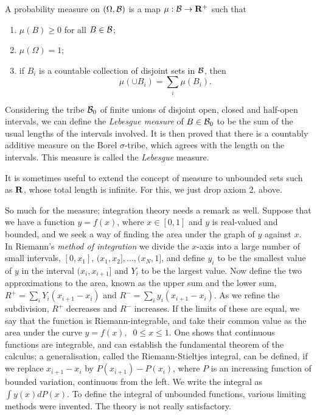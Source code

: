 A probability measure on $(\Omega,{\cal B})$ is a map $\mu:{\cal B}
\rightarrow{\bf R}^+$ such that
\begin{enumerate}
\item $\mu(B)\geq0$ for all $B\in{\cal B}$;
\item $\mu(\Omega)=1$;
\item if $B_i$ is a countable collection of disjoint sets in ${\cal B}$,
then
\[\mu(\cup B_i)=\sum_i\mu(B_i).\]
\end{enumerate}
Considering the tribe ${\cal B}_0$ of finite unions of disjoint open,
closed
and half-open intervals, we can define the {\em Lebesgue measure} of
$B\in{\cal B}_0$ to be the sum of the usual lengths of the intervals
involved. It is then proved that there is a countably additive measure
on the Borel $\sigma$-tribe, which agrees with the length on the intervals.
This measure is called the {\em Lebesgue} measure.

It is sometimes useful to extend the concept of measure to unbounded sets
such as ${\bf R}$, whose total length is infinite. For this, we just
drop axiom 2. above.

So much for the measure; integration theory needs a remark as well.
Suppose that we have a function $y=f(x)$, where $x\in[0,1]$ and
$y$ is real-valued and bounded,
and we seek a way of finding the area under the graph of $y$ against
$x$. In Riemann's {\em method of integration} we divide the $x$-axis
into a large number of small intervals, $[0,x_1],\,(x_1,x_2],\ldots,
(x_N,1]$, and define $y_i$ to be the smallest value of $y$ in the
interval $(x_i,x_{i+1}]$ and $Y_i$ to be the largest value.
Now define the two approximations
to the area, known as the upper sum and the lower sum,
$R^+=\sum_i Y_i(x_{i+1}-x_i)$ and $R^-=\sum_i y_i(x_{i+1}-x_i)$.
As we refine the subdivision, $R^+$ decreases
and $R^-$ increases. If the limits of these are equal, we say that the
function is Riemann-integrable, and take
their common value as the area under the curve $y=f(x),\;\;0\leq x\leq1$.
One shows that continuous functions are
integrable, and can establish the fundamental theorem of the
calculus; a generalisation, called the Riemann-Stieltjes integral,
can be defined, if we replace $x_{i+1}-x_i$ by $P(x_{i+1})-P(x_i)$, where
$P$ is an increasing function of bounded variation, continuous from the left.
We write the integral as $\int y(x)dP(x)$.
To define the integral of unbounded functions, various limiting methods were
invented. The theory is not really satisfactory.

